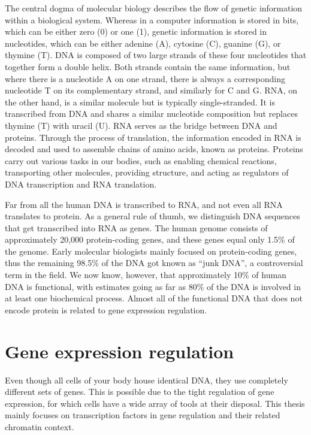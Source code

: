 The central dogma of molecular biology describes the flow of genetic information within a biological system. Whereas in a computer information is stored in bits, which can be either zero (0) or one (1), genetic information is stored in nucleotides, which can be either adenine (A), cytosine (C), guanine (G), or thymine (T). DNA is composed of two large strands of these four nucleotides that together form a double helix. Both strands contain the same information, but where there is a nucleotide A on one strand, there is always a corresponding nucleotide T on its complementary strand, and similarly for C and G. RNA, on the other hand, is a similar molecule but is typically single-stranded. It is transcribed from DNA and shares a similar nucleotide composition but replaces thymine (T) with uracil (U). RNA serves as the bridge between DNA and proteins. Through the process of translation, the information encoded in RNA is decoded and used to assemble chains of amino acids, known as proteins. Proteins carry out various tasks in our bodies, such as enabling chemical reactions, transporting other molecules, providing structure, and acting as regulators of DNA transcription and RNA translation.

Far from all the human DNA is transcribed to RNA, and not even all RNA translates to protein. As a general rule of thumb, we distinguish DNA sequences that get transcribed into RNA as genes. The human genome consists of approximately 20,000 protein-coding genes, and these genes equal only 1.5\% of the genome\cite{Piovesan2019}. Early molecular biologists mainly focused on protein-coding genes, thus the remaining 98.5\% of the DNA got known as ``junk DNA'', a controversial term in the field\cite{Graur2013}. We now know, however, that approximately 10\% of human DNA is functional\cite{Graur2013}, with estimates going as far as 80\% of the DNA is involved in at least one biochemical process\cite{encode2012}. Almost all of the functional DNA that does not encode protein is related to gene expression regulation.

\section{Gene expression regulation}

Even though all cells of your body house identical DNA, they use completely different sets of genes. This is possible due to the tight regulation of gene expression, for which cells have a wide array of tools at their disposal. This thesis mainly focuses on transcription factors in gene regulation and their related chromatin context.


